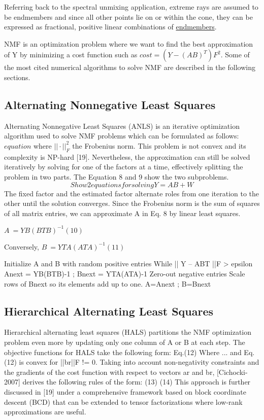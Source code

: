 Referring back to the spectral unmixing application, extreme rays are assumed to be endmembers and since all other points lie on or within the cone, they can be expressed as fractional, positive linear combinations of \underline{endmembers}.

NMF is an optimization problem where we want to find the best approximation of Y by minimizing a cost function such as $ cost = (Y-(AB)^T )F^2. $ Some of the most cited numerical algorithms to solve NMF are described in the following sections.

\subsection{Alternating Nonnegative Least Squares}
Alternating Nonnegative Least Squares (ANLS) is an iterative optimization algorithm used to solve NMF problems which can be formulated as follows:
$ equation $
where $||\cdot||_F^2$ the Frobenius norm.  This problem is not convex and its complexity is NP-hard [19].  Nevertheless, the approximation can still be solved iteratively by solving for one of the factors at a time, effectively splitting the problem in two parts.  The Equation 8 and 9 show the two subproblems.\\
\begin{equation}
	Show 2 equations for solving Y=AB+W
\end{equation}
The fixed factor and the estimated factor alternate roles from one iteration to the other until the solution converges.  Since the Frobenius norm is the sum of squares of all matrix entries, we can approximate A in Eq. 8 by linear least squares.  

$
A ~= YB(BTB)^{-1}	(10)
$

Conversely,
$	B ~= YTA(ATA)^{-1}	(11) $

Initialize A and B with random positive entries
While || Y – ABT ||F > epsilon
Anext = YB(BTB)-1 ;   Bnext = YTA(ATA)-1
Zero-out negative entries
Scale rows of Bnext so its elements add up to one.
A=Anext ;  B=Bnext

\subsection{Hierarchical Alternating Least Squares}
Hierarchical alternating least squares (HALS) partitions the NMF optimization problem even more by updating only one column of A or B at each step.  The objective functions for HALS take the following form:
Eq.(12)
Where ... and Eq. (12) is convex for ||br||F != 0.  Taking into account non-negativity constraints and the gradients of the cost function with respect to vectors ar and br, [Cichocki-2007] derives the following rules of the form:
(13)
(14)
This approach is further discussed in [19] under a comprehensive framework based on block coordinate descent (BCD) that can be extended to tensor factorizations where low-rank approximations are useful.

